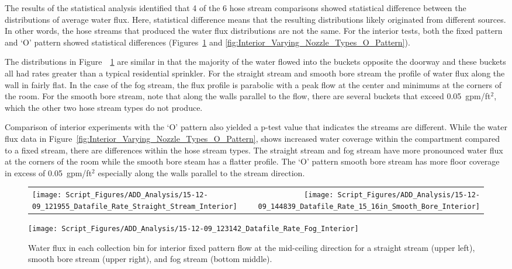 \documentclass[12pt,oneside]{book}
\begin{document}
The results of the statistical analysis identified that 4 of the 6 hose stream comparisons showed statistical difference between the distributions of average water flux. Here, statistical difference means that the resulting distributions likely originated from different sources. In other words, the hose streams that produced the water flux distributions are not the same. For the interior tests, both the fixed pattern and `O' pattern showed statistical differences (Figures~\ref{fig:Interior_Varying_Nozzle_Types_Fixed_Pattern} and \ref{fig:Interior_Varying_Nozzle_Types_O_Pattern}). 

The distributions in Figure~~\ref{fig:Interior_Varying_Nozzle_Types_Fixed_Pattern} are similar in that the majority of the water flowed into the buckets opposite the doorway and these buckets all had rates greater than a typical residential sprinkler. For the straight stream and smooth bore stream the profile of water flux along the wall in fairly flat. In the case of the fog stream, the flux profile is parabolic with a peak flow at the center and minimums at the corners of the room. For the smooth bore stream, note that along the walls parallel to the flow, there are several buckets that exceed 0.05~gpm/ft$^2$, which the other two hose stream types do not produce. 

Comparison of interior experiments with the `O' pattern also yielded a p-test value that indicates the streams are different. While the water flux data in Figure~\ref{fig:Interior_Varying_Nozzle_Types_O_Pattern}, shows increased water coverage within the compartment compared to a fixed stream, there are differences within the hose stream types. The straight stream and fog stream have more pronounced water flux at the corners of the room while the smooth bore steam has a flatter profile. The `O' pattern smooth bore stream has more floor coverage in excess of 0.05~gpm/ft$^2$ especially along the walls parallel to the stream direction.


\begin{figure}[!ht]
\begin{tabular*}{\textwidth}{lr}
\texttt{[image: Script\_Figures/ADD\_Analysis/15-12-09\_121955\_Datafile\_Rate\_Straight\_Stream\_Interior]} &
\texttt{[image: Script\_Figures/ADD\_Analysis/15-12-09\_144839\_Datafile\_Rate\_15\_16in\_Smooth\_Bore\_Interior]} \\
\end{tabular*}
\centering
\texttt{[image: Script\_Figures/ADD\_Analysis/15-12-09\_123142\_Datafile\_Rate\_Fog\_Interior]} \\
\caption[Water Flux for Varying Interior Fixed Pattern Hose Stream Types]{Water flux in each collection bin for interior fixed pattern flow at the mid-ceiling direction for a straight stream (upper left), smooth bore stream (upper right), and fog stream (bottom middle).}
\label{fig:Interior_Varying_Nozzle_Types_Fixed_Pattern}
\end{figure}
\end{document}
